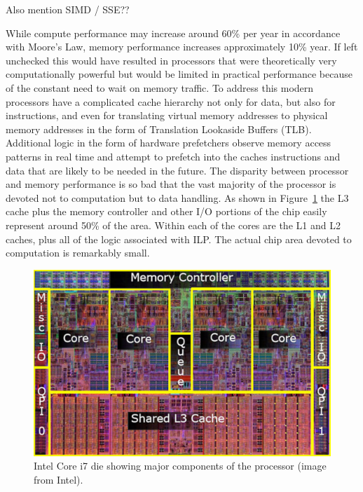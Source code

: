 \documentclass{JINST}
\begin{document}
Also mention SIMD / SSE??

While compute performance may increase around 60\% per year in accordance with Moore's Law, memory performance increases approximately 10\% year.  If left unchecked this would have resulted in processors that were theoretically very computationally powerful but would be limited in practical performance because of the constant need to wait on memory traffic.  To address this modern processors have a complicated cache hierarchy not only for data, but also for instructions, and even for translating virtual memory addresses to physical memory addresses in the form of Translation Lookaside Buffers (TLB).  Additional logic in the form of hardware prefetchers observe memory access patterns in real time and attempt to prefetch into the caches instructions and data that are likely to be needed in the future.  The disparity between processor and memory performance is so bad that the vast majority of the processor is devoted not to computation but to data handling.  As shown in Figure~\ref{fig:core_i7_die} the L3 cache plus the memory controller and other I/O portions of the chip easily represent around 50\% of the area.  Within each of the cores are the L1 and L2 caches, plus all of the logic associated with ILP.  The actual chip area devoted to computation is remarkably small.

\begin{figure}[!Hhtb]
\begin{center}
	\includegraphics[width=1.0\textwidth]{figs/Core_i7_die.pdf}
	\caption{Intel Core i7 die showing major components of the processor (image from Intel). \label{fig:core_i7_die}}
\end{center}
\end{figure}
\end{document}
